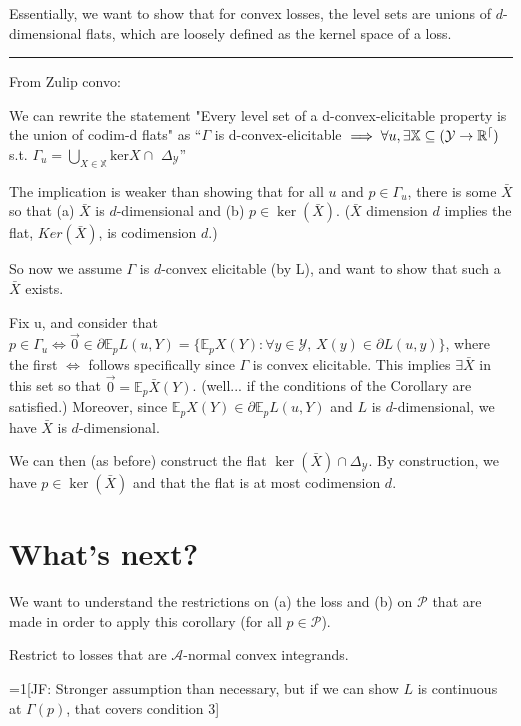 \documentclass[12pt]{article}
\newcommand{\Comments}{1}
\newcommand{\mynote}[2]{\ifnum\Comments=1\textcolor{#1}{#2}\fi}
\newcommand{\jessie}[1]{\mynote{green!75!black}{[JF: #1]}}
\newcommand{\A}{\mathcal{A}}
\newcommand{\E}{\mathbb{E}}
\renewcommand{\P}{\mathcal{P}}
\begin{document}
Essentially, we want to show that for convex losses, the level sets are unions of $d$-dimensional flats, which are loosely defined as the kernel space of a loss.

\hrule
From Zulip convo:

We can rewrite the statement "Every level set of a d-convex-elicitable property is the union of codim-d flats" as 
``$\Gamma$ is d-convex-elicitable $\implies \forall u, \exists \mathbb X \subseteq  (\cal Y \to\mathbb{R}^d)$  s.t.  $\Gamma_u = \bigcup_{X \in \mathbb{X}} \mathrm{ker} X \cap \,\,\Delta_{\mathcal{Y}}$''

The implication is weaker than showing that for all $u$ and $p \in \Gamma_u$, there is some $\bar X$ so that (a) $\bar X$ is $d$-dimensional and (b) $p \in \ker( \bar X)$.  ($\bar X$ dimension $d$ implies the flat, $Ker(\bar X)$, is codimension $d$.)

So now we assume $\Gamma$ is $d$-convex elicitable (by L), and want to show that such a $\bar X$ exists.

Fix u, and consider that $p \in \Gamma_u \iff \vec 0 \in \partial \mathbb{E}_p L(u,Y) = \{\E_p X(Y) : \forall y \in \mathcal{Y}, \, X(y) \in \partial L(u,y) \}$, where the first $\iff$ follows specifically since $\Gamma$ is convex elicitable.  
This implies $\exists \bar X$ in this set so that $\vec 0 = \E_p \bar X(Y)$.  
(well... if the conditions of the Corollary are satisfied.)  
Moreover, since $\E_p X(Y) \in \partial \mathbb{E}_p L(u,Y)$ and $L$ is $d$-dimensional, we have $\bar X$ is $d$-dimensional.

We can then (as before) construct the flat $ \ker(\bar X) \cap \Delta_{\mathcal{Y}}$.  
By construction, we have $p \in \ker(\bar X)$ and that the flat is at most codimension $d$.

\section{What's next?}
We want to understand the restrictions on (a) the loss and (b) on $\P$ that are made in order to apply this corollary (for all $p\in \P$).

Restrict to losses that are $\A$-normal convex integrands.


\jessie{Stronger assumption than necessary, but if we can show $L$ is continuous at $\Gamma(p)$, that covers condition 3}
\end{document}

